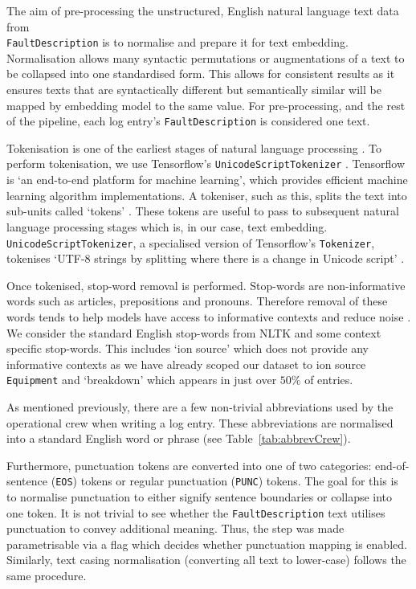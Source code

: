 \documentclass[10pt,oneside]{report}
\begin{document}
The aim of pre-processing the unstructured, English natural language text data from \\ \texttt{FaultDescription} is to normalise and prepare it for text embedding. Normalisation allows many syntactic permutations or augmentations of a text to be collapsed into one standardised form. This allows for consistent results as it ensures texts that are syntactically different but semantically similar will be mapped by embedding model to the same value. For pre-processing, and the rest of the pipeline, each log entry's \texttt{FaultDescription} is considered one text.

Tokenisation is one of the earliest stages of natural language processing \cite{tabassum2020survey, sammons2016edison}. To perform tokenisation, we use Tensorflow's \texttt{UnicodeScriptTokenizer} \cite{tensorflow2015whitepaper}. Tensorflow is `an end-to-end platform for machine learning', which provides efficient machine learning algorithm implementations. A tokeniser, such as this, splits the text into sub-units called `tokens' \cite{gefenstette1999tokenization}. These tokens are useful to pass to subsequent natural language processing stages which is, in our case, text embedding. \texttt{UnicodeScriptTokenizer}, a specialised version of Tensorflow's \texttt{Tokenizer}, tokenises `UTF-8 strings by splitting where there is a change in Unicode script' \cite{tensorflow2015whitepaper}.

Once tokenised, stop-word removal is performed. Stop-words are non-informative words such as articles, prepositions and pronouns. Therefore removal of these words tends to help models have access to informative contexts and reduce noise \cite{silva2003importance}. We consider the standard English stop-words from NLTK \cite{bird2009natural} and some context specific stop-words. This includes `ion source' which does not provide any informative contexts as we have already scoped our dataset to ion source \texttt{Equipment} and `breakdown' which appears in just over $50\%$ of entries. 

As mentioned previously, there are a few non-trivial abbreviations used by the operational crew when writing a log entry. These abbreviations are normalised into a standard English word or phrase (see Table~\ref{tab:abbrevCrew}).

Furthermore, punctuation tokens are converted into one of two categories: end-of-sentence (\texttt{EOS}) tokens or regular punctuation (\texttt{PUNC}) tokens. The goal for this is to normalise punctuation to either signify sentence boundaries or collapse into one token. It is not trivial to see whether the \texttt{FaultDescription} text utilises punctuation to convey additional meaning. Thus, the step was made parametrisable via a flag which decides whether punctuation mapping is enabled. Similarly, text casing normalisation (converting all text to lower-case) follows the same procedure. 
\end{document}
